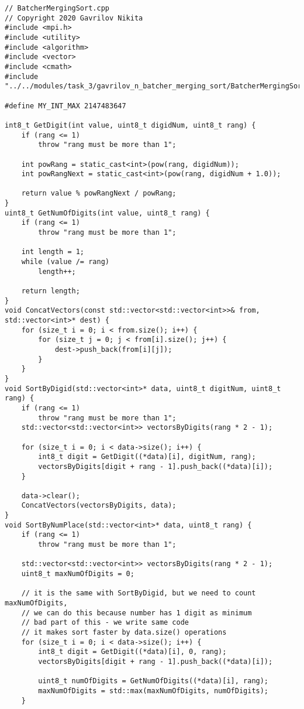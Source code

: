 \documentclass{report}
\begin{document}
\begin{lstlisting}
// BatcherMergingSort.cpp
// Copyright 2020 Gavrilov Nikita
#include <mpi.h>
#include <utility>
#include <algorithm>
#include <vector>
#include <cmath>
#include "../../modules/task_3/gavrilov_n_batcher_merging_sort/BatcherMergingSort.h"

#define MY_INT_MAX 2147483647

int8_t GetDigit(int value, uint8_t digidNum, uint8_t rang) {
    if (rang <= 1)
        throw "rang must be more than 1";

    int powRang = static_cast<int>(pow(rang, digidNum));
    int powRangNext = static_cast<int>(pow(rang, digidNum + 1.0));

    return value % powRangNext / powRang;
}
uint8_t GetNumOfDigits(int value, uint8_t rang) {
    if (rang <= 1)
        throw "rang must be more than 1";

    int length = 1;
    while (value /= rang)
        length++;

    return length;
}
void ConcatVectors(const std::vector<std::vector<int>>& from, std::vector<int>* dest) {
    for (size_t i = 0; i < from.size(); i++) {
        for (size_t j = 0; j < from[i].size(); j++) {
            dest->push_back(from[i][j]);
        }
    }
}
void SortByDigid(std::vector<int>* data, uint8_t digitNum, uint8_t rang) {
    if (rang <= 1)
        throw "rang must be more than 1";
    std::vector<std::vector<int>> vectorsByDigits(rang * 2 - 1);

    for (size_t i = 0; i < data->size(); i++) {
        int8_t digit = GetDigit((*data)[i], digitNum, rang);
        vectorsByDigits[digit + rang - 1].push_back((*data)[i]);
    }

    data->clear();
    ConcatVectors(vectorsByDigits, data);
}
void SortByNumPlace(std::vector<int>* data, uint8_t rang) {
    if (rang <= 1)
        throw "rang must be more than 1";

    std::vector<std::vector<int>> vectorsByDigits(rang * 2 - 1);
    uint8_t maxNumOfDigits = 0;

    // it is the same with SortByDigid, but we need to count maxNumOfDigits,
    // we can do this because number has 1 digit as minimum
    // bad part of this - we write same code
    // it makes sort faster by data.size() operations
    for (size_t i = 0; i < data->size(); i++) {
        int8_t digit = GetDigit((*data)[i], 0, rang);
        vectorsByDigits[digit + rang - 1].push_back((*data)[i]);

        uint8_t numOfDigits = GetNumOfDigits((*data)[i], rang);
        maxNumOfDigits = std::max(maxNumOfDigits, numOfDigits);
    }


\end{lstlisting}
\end{document}
